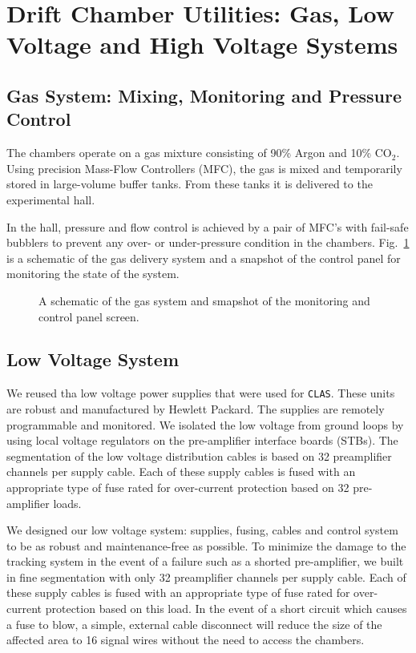 \section{Drift Chamber Utilities: Gas, Low Voltage and High Voltage Systems}

\subsection{Gas System: Mixing, Monitoring and Pressure Control}

The chambers operate on a gas mixture consisting of 90\% Argon and 10\% CO$_2$.
Using precision Mass-Flow Controllers (MFC), the gas is mixed and temporarily
stored in large-volume buffer tanks.  From these tanks it is delivered
to the experimental hall.  

In the hall, pressure and flow control is achieved by a pair of MFC's with
fail-safe bubblers to prevent any over- or under-pressure condition in
the chambers.  
Fig.~\ref{dc-gas-system} is a schematic of the gas delivery system 
and a snapshot 
of the control panel for monitoring the state of the system.

\begin{figure}[htpb]   
\vspace{4.5cm}
\caption{\small{A schematic of the gas system and smapshot of the monitoring
and control panel screen.}}
\label{dc-gas-system}
\end{figure}   

 
\subsection{Low Voltage System}
We reused tha low voltage power supplies that were used for {\tt CLAS}.  
These units are robust and manufactured by Hewlett Packard.  
The supplies are remotely programmable and monitored.   We 
isolated the low voltage from 
ground loops by using local voltage regulators on the pre-amplifier interface 
boards (STBs).  The segmentation of the low voltage distribution cables is 
based on 32 preamplifier channels per supply cable.  Each of these supply 
cables is fused with an appropriate type of fuse rated for over-current 
protection based on 32 pre-amplifier loads.  

We designed our low voltage system: supplies, fusing, cables and control
system to be as robust and maintenance-free as possible.  To minimize
the damage to the tracking system in the event of a failure such as
a shorted pre-amplifier, we built in fine segmentation with only
32 preamplifier channels per supply cable.  Each of these supply 
cables is fused with an appropriate type of fuse rated for over-current 
protection based on this load.
In the event of a short circuit which causes a fuse to blow,
a simple, external cable disconnect will reduce the size of the affected
area to 16 signal wires without the need to access the chambers.

